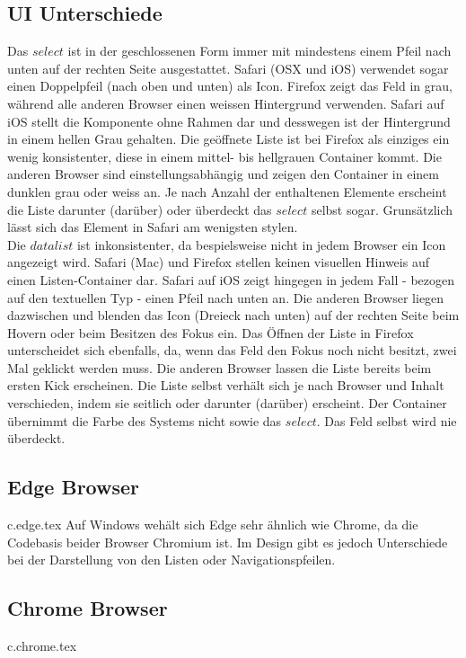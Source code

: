 \subsection{UI Unterschiede}
Das $select$ ist in der geschlossenen Form immer mit mindestens einem Pfeil nach unten auf der rechten Seite ausgestattet.
Safari (OSX und iOS) verwendet sogar einen Doppelpfeil (nach oben und unten) als Icon.
Firefox zeigt das Feld in grau, während alle anderen Browser einen weissen Hintergrund verwenden.
Safari auf iOS stellt die Komponente ohne Rahmen dar und desswegen ist der Hintergrund in einem hellen Grau gehalten.
Die geöffnete Liste ist bei Firefox als einziges ein wenig konsistenter, diese in einem mittel- bis hellgrauen Container kommt.
Die anderen Browser sind einstellungsabhängig und zeigen den Container in einem dunklen grau oder weiss an.
Je nach Anzahl der enthaltenen Elemente erscheint die Liste darunter (darüber) oder überdeckt das $select$ selbst sogar.
Grunsätzlich lässt sich das Element in Safari am wenigsten stylen.
\\
Die $datalist$ ist inkonsistenter, da bespielsweise nicht in jedem Browser ein Icon angezeigt wird.
Safari (Mac) und Firefox stellen keinen visuellen Hinweis auf einen Listen-Container dar.
Safari auf iOS zeigt hingegen in jedem Fall - bezogen auf den textuellen Typ - einen Pfeil nach unten an.
Die anderen Browser liegen dazwischen und blenden das Icon (Dreieck nach unten) auf der rechten Seite beim Hovern oder beim Besitzen des Fokus ein.
Das Öffnen der Liste in Firefox unterscheidet sich ebenfalls, da, wenn das Feld den Fokus noch nicht besitzt, zwei Mal geklickt werden muss.
Die anderen Browser lassen die Liste bereits beim ersten Kick erscheinen.
Die Liste selbst verhält sich je nach Browser und Inhalt verschieden, indem sie seitlich oder darunter (darüber) erscheint.
Der Container übernimmt die Farbe des Systems nicht sowie das $select$.
Das Feld selbst wird nie überdeckt.

\clearpage
\subsection{Edge Browser}
{c.edge.tex}
Auf Windows wehält sich Edge sehr ähnlich wie Chrome, da die Codebasis beider Browser Chromium ist.
Im Design gibt es jedoch Unterschiede bei der Darstellung von den Listen oder Navigationspfeilen. 

\clearpage
\subsection{Chrome Browser}
{c.chrome.tex}

